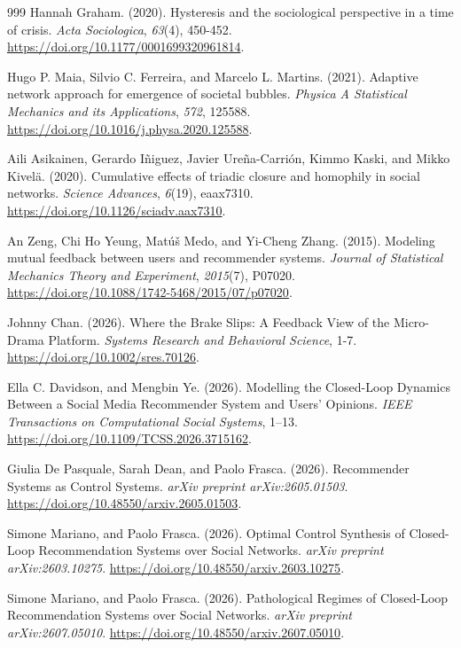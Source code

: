 \documentclass[10pt,a4paper]{article}
\begin{document}
\begin{thebibliography}{999}
Hannah Graham. (2020). Hysteresis and the sociological perspective in a time of crisis. \textit{Acta Sociologica}, \textit{63}(4), 450-452. \url{https://doi.org/10.1177/0001699320961814}.

Hugo P. Maia, Silvio C. Ferreira, and Marcelo L. Martins. (2021). Adaptive network approach for emergence of societal bubbles. \textit{Physica A Statistical Mechanics and its Applications}, \textit{572}, 125588. \url{https://doi.org/10.1016/j.physa.2020.125588}.

Aili Asikainen, Gerardo I\~{n}iguez, Javier Ure\~{n}a-Carri\'{o}n, Kimmo Kaski, and Mikko Kivel\"{a}. (2020). Cumulative effects of triadic closure and homophily in social networks. \textit{Science Advances}, \textit{6}(19), eaax7310. \url{https://doi.org/10.1126/sciadv.aax7310}.

An Zeng, Chi Ho Yeung, Mat\'{u}\v{s} Medo, and Yi-Cheng Zhang. (2015). Modeling mutual feedback between users and recommender systems. \textit{Journal of Statistical Mechanics Theory and Experiment}, \textit{2015}(7), P07020. \url{https://doi.org/10.1088/1742-5468/2015/07/p07020}.

Johnny Chan. (2026). Where the Brake Slips: A Feedback View of the Micro-Drama Platform. \textit{Systems Research and Behavioral Science}, 1-7. \url{https://doi.org/10.1002/sres.70126}.

Ella C. Davidson, and Mengbin Ye. (2026). Modelling the Closed-Loop Dynamics Between a Social Media Recommender System and Users' Opinions. \textit{IEEE Transactions on Computational Social Systems}, 1--13. \url{https://doi.org/10.1109/TCSS.2026.3715162}.

Giulia De Pasquale, Sarah Dean, and Paolo Frasca. (2026). Recommender Systems as Control Systems. \textit{arXiv preprint arXiv:2605.01503}. \url{https://doi.org/10.48550/arxiv.2605.01503}.

Simone Mariano, and Paolo Frasca. (2026). Optimal Control Synthesis of Closed-Loop Recommendation Systems over Social Networks. \textit{arXiv preprint arXiv:2603.10275}. \url{https://doi.org/10.48550/arxiv.2603.10275}.

Simone Mariano, and Paolo Frasca. (2026). Pathological Regimes of Closed-Loop Recommendation Systems over Social Networks. \textit{arXiv preprint arXiv:2607.05010}. \url{https://doi.org/10.48550/arxiv.2607.05010}.


\end{thebibliography}
\end{document}
